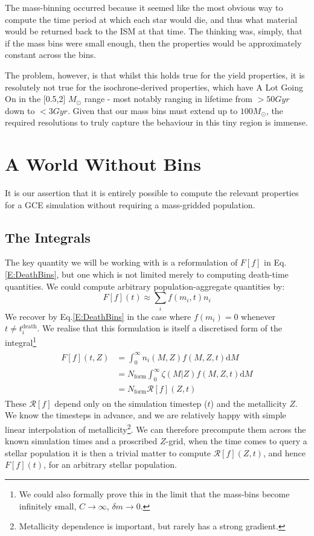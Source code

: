 \documentclass[a4paper,11pt]{article}
\def\d{\mathrm d}
\begin{document}
		The mass-binning occurred because it seemed like the most obvious way to compute the time period at which each star would die, and thus what material would be returned back to the ISM at that time. The thinking was, simply, that if the mass bins were small enough, then the properties would be approximately constant across the bins. 

		

		The problem, however, is that whilst this holds true for the yield properties, it is resolutely not true for the isochrone-derived properties, which have A Lot Going On in the [0.5,2] $M_\odot$ range - most notably ranging in lifetime from $>50Gyr$ down to $<3Gyr$. Given that our mass bins must extend up to $100M_\odot$, the required resolutions to truly capture the behaviour in this tiny region is immense.

	\section{A World Without Bins}
		It is our assertion that it is entirely possible to compute the relevant properties for a GCE simulation without requiring a mass-gridded population. 
		
		\subsection{The Integrals}

			The key quantity we will be working with is a reformulation of $F[f]$ in Eq.\eqref{E:DeathBins}, but one which is not limited merely to computing death-time quantities. We could compute arbitrary population-aggregate quantities by:
			\begin{equation}
				F[f](t) \approx \sum_i f(m_i,t) n_i
			\end{equation}
			We recover by Eq.\eqref{E:DeathBins} in the case where $f(m_i) = 0$ whenever $t \neq t^\text{death}_i$. We realise that this formulation is itself a discretised form of the integral\footnote{We could also formally prove this in the limit that the mass-bins become infinitely small, $C\to\infty$, $\delta m \to 0$.}
			\begin{align}
				\begin{split}
				F[f](t,Z) & = \int_0^\infty n_i(M,Z) f(M,Z,t) \d M
				\\
				& = N_\text{form} \int_0^\infty \zeta(M|Z) f(M,Z,t) \d M
				\\
				& = N_\text{form}  \mathcal{R}[f](Z,t)
				\end{split}\label{E:FormalStatement}
			\end{align}
			These $\mathcal{R}[f]$ depend only on the simulation timestep ($t$) and the metallicity $Z$. We know the timesteps in advance, and we are relatively happy with simple linear interpolation of metallicity\footnote{Metallicity dependence is important, but rarely has a strong gradient.}. We can therefore precompute them across the known simulation times and a proscribed $Z$-grid, when the time comes to query a stellar population it is then a trivial matter to compute $\mathcal{R}[f](Z,t)$, and hence $F[f](t)$, for an arbitrary stellar population. 
\end{document}
